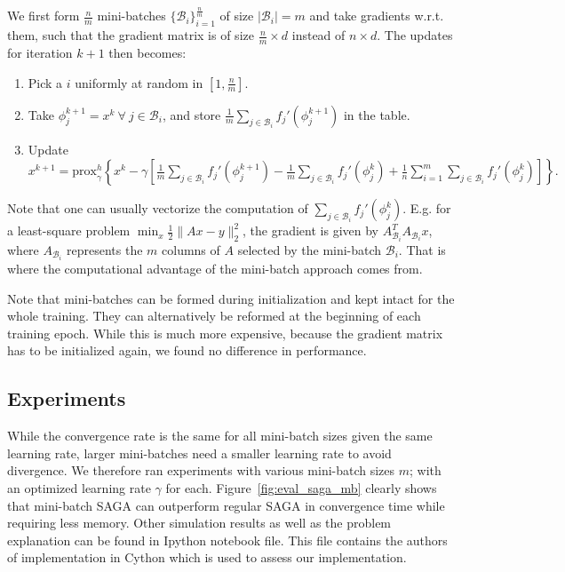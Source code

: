 \documentclass[a4paper,11pt]{article}
\newcommand{\B}{\mathcal{B}}
\newcommand{\figref}[1]{Figure~\ref{fig:#1}}
\newcommand{\prox}{\textrm{prox}}
\begin{document}
We first form $\frac{n}m$ mini-batches $\{\B_i\}_{i=1}^{\frac{n}m}$ of size
$|\B_i| = m$ and take gradients w.r.t. them, such that the gradient matrix is of
size $\frac{n}m \times d$ instead of $n \times d$. The updates for iteration
$k+1$ then becomes:
\begin{enumerate}
\item Pick a $i$ uniformly at random in $[1, \frac{n}m]$.
\item Take $\phi_j^{k+1} = x^k \ \forall \ j \in \B_i$, and store $\frac1m
	\sum_{j\in\B_i} f_j'(\phi_j^{k+1})$ in the table.
\item Update $x^{k+1} = \prox_\gamma^h \left\{
	x^k - \gamma \left[ \frac1m \sum_{j\in\B_i} f_j'(\phi_j^{k+1})
	- \frac1m \sum_{j\in\B_i} f_j'(\phi_j^k)
	+ \frac1n \sum_{i=1}^m \sum_{j\in\B_i} f_j'(\phi_j^k) \right] \right\}.$
\end{enumerate}

Note that one can usually vectorize the computation of $\sum_{j\in\B_i}
f_j'(\phi_j^k)$. E.g. for a least-square problem $\min_x \frac12 \|Ax -
y\|_2^2$, the gradient is given by $A_{\B_i}^T A_{\B_i} x$, where $A_{\B_i}$
represents the $m$ columns of $A$ selected by the mini-batch $\B_i$. That is
where the computational advantage of the mini-batch approach comes from.

Note that mini-batches can be formed during initialization and kept intact for
the whole training. They can alternatively be reformed at the beginning of each
training epoch. While this is much more expensive, because the gradient matrix
has to be initialized again, we found no difference in performance.

\subsection{Experiments}

While the convergence rate is the same for all mini-batch sizes given the same
learning rate, larger mini-batches need a smaller learning rate to avoid
divergence.  We therefore ran experiments with various mini-batch sizes $m$;
with an optimized learning rate $\gamma$ for each. \figref{eval_saga_mb} clearly
shows that mini-batch SAGA can outperform regular SAGA in convergence time while
requiring less memory. Other simulation results as well as the problem explanation can be found in Ipython notebook file. This file contains the authors of \cite{defazio_saga_2014} implementation in Cython which is used to assess our implementation.
\end{document}
